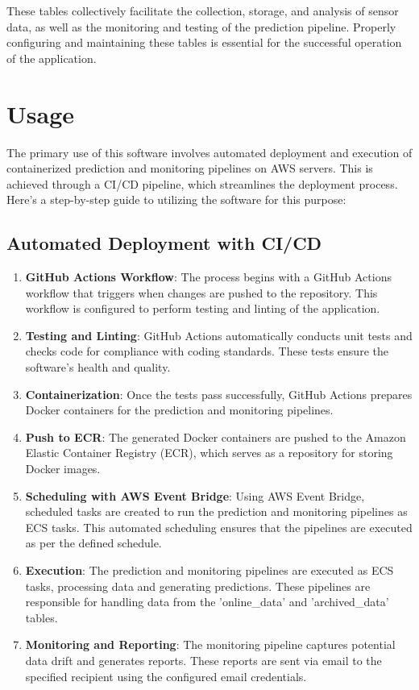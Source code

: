 \documentclass{report}
\begin{document}
These tables collectively facilitate the collection, storage, and analysis of sensor data, as well as the monitoring and testing of the prediction pipeline. Properly configuring and maintaining these tables is essential for the successful operation of the application.


\chapter{Usage}

The primary use of this software involves automated deployment and execution of containerized prediction and monitoring pipelines on AWS servers. This is achieved through a CI/CD pipeline, which streamlines the deployment process. Here's a step-by-step guide to utilizing the software for this purpose:

\section{Automated Deployment with CI/CD}

\begin{enumerate}
  \item \textbf{GitHub Actions Workflow}: The process begins with a GitHub Actions workflow that triggers when changes are pushed to the repository. This workflow is configured to perform testing and linting of the application.

  \item \textbf{Testing and Linting}: GitHub Actions automatically conducts unit tests and checks code for compliance with coding standards. These tests ensure the software's health and quality.

  \item \textbf{Containerization}: Once the tests pass successfully, GitHub Actions prepares Docker containers for the prediction and monitoring pipelines.

  \item \textbf{Push to ECR}: The generated Docker containers are pushed to the Amazon Elastic Container Registry (ECR), which serves as a repository for storing Docker images.

  \item \textbf{Scheduling with AWS Event Bridge}: Using AWS Event Bridge, scheduled tasks are created to run the prediction and monitoring pipelines as ECS tasks. This automated scheduling ensures that the pipelines are executed as per the defined schedule.

  \item \textbf{Execution}: The prediction and monitoring pipelines are executed as ECS tasks, processing data and generating predictions. These pipelines are responsible for handling data from the 'online\_data' and 'archived\_data' tables.

  \item \textbf{Monitoring and Reporting}: The monitoring pipeline captures potential data drift and generates reports. These reports are sent via email to the specified recipient using the configured email credentials.

\end{enumerate}
\end{document}
